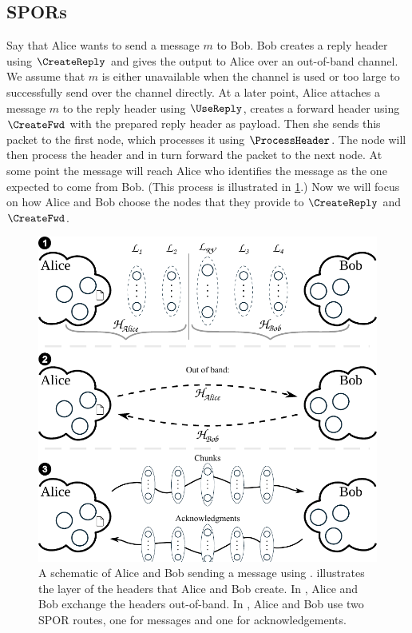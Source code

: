 
\subsection{\Acfp*{SPOR}}%
\label{sec:global_overlay}
\label{sec:message_passing}

Say that Alice wants to send a message \(m\) to Bob.
Bob creates a reply header using \(\CreateReply\) and gives the output to Alice 
over an out-of-band channel.
We assume that \(m\) is either unavailable when the channel is used or too 
large to successfully send over the channel directly.
At a later point, Alice attaches a message \(m\) to the reply header using 
\(\UseReply\), creates a forward header using \(\CreateFwd\) with the prepared 
reply header as payload.
Then she sends this packet to the first node, which processes it using 
\(\ProcessHeader\).
The node will then process the header and in turn forward the packet to the 
next node.
At some point the message will reach Alice who identifies the message as the 
one expected to come from Bob.
(This process is illustrated in \cref{fig:file-exchange}.)
Now we will focus on how Alice and Bob choose the nodes that they provide to 
\(\CreateReply\) and \(\CreateFwd\).

\begin{figure}
  \includegraphics[width=\linewidth]{figures/file_exchange_v2.pdf}
  \caption{\label{fig:file-exchange}%
    A schematic of Alice and Bob sending a message using \name.
     illustrates the layer of the headers that Alice and Bob create.
    In , Alice and Bob exchange the headers out-of-band.
    In , Alice and Bob use two \ac{SPOR} routes, one for messages and 
    one for acknowledgements.
  }
\end{figure}

